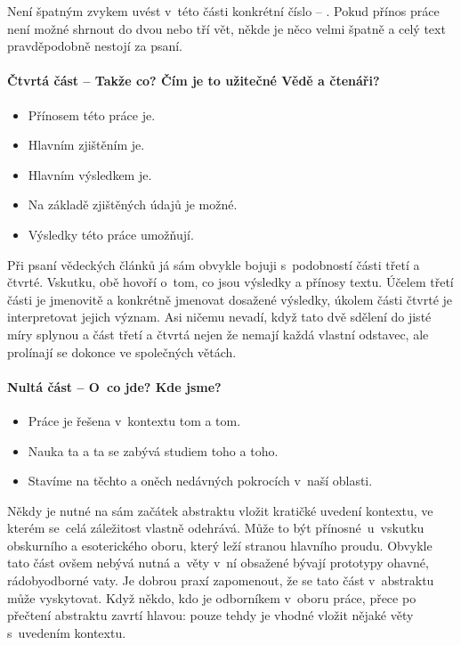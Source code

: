 Není špatným zvykem uvést v~této části konkrétní číslo -- . Pokud přínos práce není možné shrnout do dvou nebo tří vět, někde je něco velmi špatně a celý text pravděpodobně nestojí za psaní.

\paragraph{Čtvrtá část -- Takže co? Čím je to užitečné Vědě a čtenáři?}
\begin{itemize}
  \item{Přínosem této práce je.}
  \item{Hlavním zjištěním je.}
  \item{Hlavním výsledkem je.}
  \item{Na základě zjištěných údajů je možné.}
  \item{Výsledky této práce umožňují.}
\end{itemize}

Při psaní vědeckých článků já sám obvykle bojuji s~podobností části třetí a čtvrté. Vskutku, obě hovoří o~tom, co jsou výsledky a přínosy textu. Účelem třetí části je jmenovitě a konkrétně jmenovat dosažené výsledky, úkolem části čtvrté je interpretovat jejich význam. Asi ničemu nevadí, když tato dvě sdělení do jisté míry splynou a část třetí a čtvrtá nejen že nemají každá vlastní odstavec, ale prolínají se dokonce ve společných větách.

\paragraph{Nultá část -- O~co jde? Kde jsme?}
\begin{itemize}
  \item{Práce je řešena v~kontextu tom a tom.}
  \item{Nauka ta a ta se zabývá studiem toho a toho.}
  \item{Stavíme na těchto a oněch nedávných pokrocích v~naší oblasti.}
\end{itemize}

Někdy je nutné na sám začátek abstraktu vložit kratičké uvedení kontextu, ve kterém se~celá záležitost vlastně odehrává. Může to být přínosné~u~vskutku obskurního a esoterického oboru, který leží stranou hlavního proudu. Obvykle tato část ovšem nebývá nutná a~věty v~ní obsažené bývají prototypy ohavné, rádobyodborné vaty. Je dobrou praxí zapomenout, že se tato část v~abstraktu může vyskytovat. Když někdo, kdo je odborníkem v~oboru práce, přece po přečtení abstraktu zavrtí hlavou:  pouze tehdy je vhodné vložit nějaké věty s~uvedením kontextu.

